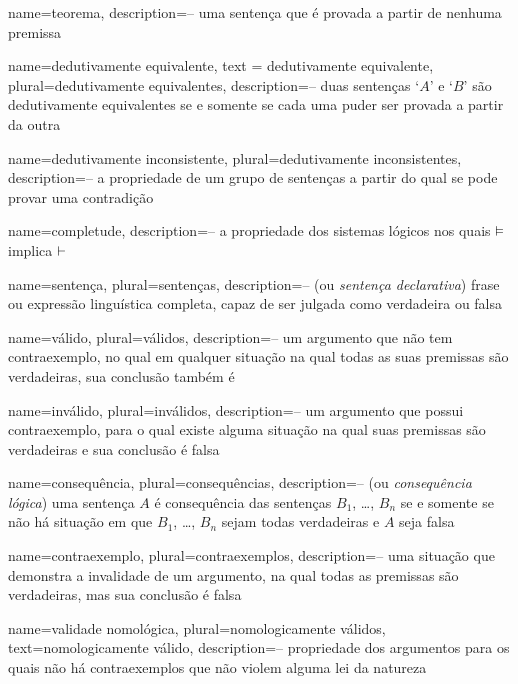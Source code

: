 {
 name=teorema,
 description={-- uma sentença que é provada a partir de nenhuma premissa}
}

{
 name=dedutivamente equivalente,
 text = dedutivamente equivalente,
 plural=dedutivamente equivalentes,
 description={-- duas sentenças `$A$' e `$B$' são  dedutivamente equivalentes se e somente se cada uma puder ser provada a partir da outra}
}

{
 name={dedutivamente inconsistente}, 
 plural={dedutivamente inconsistentes},
 description={-- a propriedade de um grupo de sentenças a partir do qual se pode provar uma contradição}
}

{
 name=completude,
 description={-- a propriedade dos sistemas lógicos nos quais $\vDash $ implica $\vdash$}
}

{
 name=sentença,
 plural=sentenças,
 description={-- (ou \textit{sentença declarativa}) frase ou expressão linguística completa, capaz de ser julgada como verdadeira ou falsa}
}

{
 name=válido,
 plural=válidos,
 description={-- um argumento que não tem contraexemplo, no qual em qualquer situação na qual todas as suas premissas são verdadeiras, sua conclusão também é}
}

{
 name=inválido,
 plural=inválidos,
 description={-- um argumento que possui contraexemplo, para o qual existe alguma situação na qual suas premissas são verdadeiras e sua conclusão é falsa}
}

{
 name=consequência,
 plural=consequências,
 description={-- (ou \textit{consequência lógica}) uma sentença $A$ é consequência das sentenças $B_1$, \dots, $B_n$ se e somente se não há situação em que $B_1$, \dots, $B_n$ sejam todas verdadeiras e $A$ seja falsa}
}

{
 name=contraexemplo,
 plural=contraexemplos,
 description={-- uma situação que demonstra a invalidade de um argumento, na qual todas as premissas são verdadeiras, mas sua conclusão é falsa}
}

{
 name=validade nomológica,
 plural=nomologicamente válidos,
 text=nomologicamente válido,
 description={-- propriedade dos argumentos para os quais não há contraexemplos que não violem alguma lei da natureza}
}

